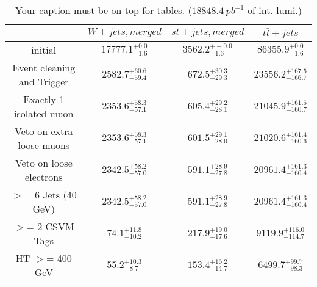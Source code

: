 \documentclass{article}
\begin{document}
\begin{table}
\caption{Your caption must be on top for tables. ($18848.4~pb^{-1}$ of int. lumi.)}
\label{tab:}
\centering
\begin{tabular}{|c|ccc|}
\toprule
&$W+jets, merged$	&$st+jets, merged$	&$t\bar{t}+jets$	\\

\midrule
initial&	$17777.1^{+0.0}_{-1.6}$	&$3562.2^{+-0.0}_{-1.6}$	&$86355.9^{+0.0}_{-1.6}$	\\

Event cleaning and Trigger&	$2582.7^{+60.6}_{-59.4}$	&$672.5^{+30.3}_{-29.3}$	&$23556.2^{+167.5}_{-166.7}$	\\

Exactly 1 isolated muon&	$2353.6^{+58.3}_{-57.1}$	&$605.4^{+29.2}_{-28.1}$	&$21045.9^{+161.5}_{-160.7}$	\\

Veto on extra loose muons&	$2353.6^{+58.3}_{-57.1}$	&$601.5^{+29.1}_{-28.0}$	&$21020.6^{+161.4}_{-160.6}$	\\

Veto on loose electrons&	$2342.5^{+58.2}_{-57.0}$	&$591.1^{+28.9}_{-27.8}$	&$20961.4^{+161.3}_{-160.4}$	\\

$>$= 6 Jets (40 GeV)&	$2342.5^{+58.2}_{-57.0}$	&$591.1^{+28.9}_{-27.8}$	&$20961.4^{+161.3}_{-160.4}$	\\

$>$= 2 CSVM Tags&	$74.1^{+11.8}_{-10.2}$	&$217.9^{+19.0}_{-17.6}$	&$9119.9^{+116.0}_{-114.7}$	\\

HT $>$=  400 GeV&	$55.2^{+10.3}_{-8.7}$	&$153.4^{+16.2}_{-14.7}$	&$6499.7^{+99.7}_{-98.3}$	\\

\bottomrule
\end{tabular}
\end{table}
\end{document}
